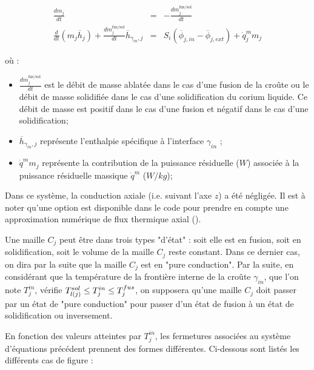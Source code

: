\begin{eqnarray}
\frac{dm_{j}}{dt} &=& - \frac{dm_{j}^\text{fus/sol}}{dt} \label{eq:mass} \\ 
 \frac{d}{dt}(m_{j}\overline{h}_{j}) + \frac{dm_{j}^\text{fus/sol}}{dt} \overline{h}_{\gamma_{in},j} & = & S_i\left(\overline{\phi}_{j,in} - \overline{\phi}_{j,ext}\right) + \dot{q}_j^m m_{j} \label{eq:enthalpie}
\end{eqnarray}

où :

\begin{itemize}
 \item $\frac{dm_j^\text{fus/sol}}{dt}$ est le débit de masse ablatée dans le cas d'une fusion de la croûte ou le débit de masse solidifiée dans le cas d'une solidification du corium liquide. Ce débit de masse est positif dans le cas d'une fusion et négatif dans le cas d'une solidification;
 \item $\overline{h}_{\gamma_{in},j}$ représente l'enthalpie spécifique à l’interface $\gamma_{in}$ ;
 \item $\dot{q}^m m_j$ représente la contribution de la puissance résiduelle ($W$) associée à la puissance résiduelle massique $\dot{q}^m$ ($W/kg$);
\end{itemize}
Dans ce système, la conduction axiale (i.e. suivant l'axe $z$) a été négligée. Il est à noter qu'une option est disponible dans le code pour prendre en compte une approximation numérique de flux thermique axial (\cite{Peybernes2018}). 

Une maille $C_j$ peut être dans trois types "d'état" : soit elle est en fusion, soit en solidification, soit le volume de la maille $C_j$ reste constant. Dans ce dernier cas, on dira par la suite que la maille $C_j$ est en "pure conduction". Par la suite, en considérant que la température de la frontière interne de la croûte $\gamma_{in}$, que l'on note $T_j^{in}$, vérifie $\temperature[sol]{l(j)}\leq T_j^{in}\leq T_j^{fus}$, on supposera qu'une maille $C_j$ doit passer par un état de "pure conduction" pour passer d'un état de fusion à un état de solidification ou inversement.

En fonction des valeurs atteintes par $T_j^{in}$, les fermetures associées au système d'équations précédent prennent des formes différentes. Ci-dessous sont listés les différents cas de figure :\\

